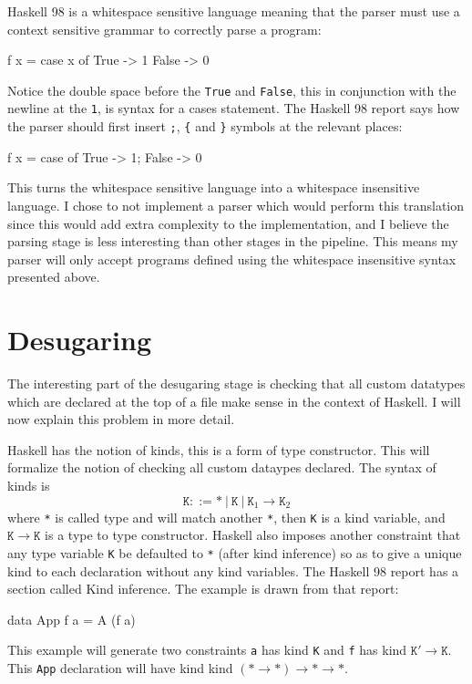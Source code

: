 \documentclass[float=false, crop=false]{standalone}
\begin{document}
Haskell 98 is a whitespace sensitive language meaning that the parser must use a
context sensitive grammar to correctly parse a program:
\begin{HaskellLst}
f x = case x of 
  True  -> 1
  False -> 0
\end{HaskellLst}
Notice the double space before the \texttt{True} and \texttt{False}, this in conjunction with the
newline at the \texttt{1}, is syntax for a cases statement. The Haskell 98 report
says how the parser should first insert \texttt{;},  \texttt{\{} and \texttt{\}} symbols at the 
relevant places:
\begin{HaskellLst}
f x = case of {
  True  -> 1;
  False -> 0
}
\end{HaskellLst}
This turns the whitespace sensitive language into a whitespace insensitive language. I chose to 
not implement a parser which would perform this translation since this would add extra complexity to the
implementation, and I believe the parsing stage is less interesting than other stages in the pipeline.
This means my parser will only accept programs defined using the whitespace insensitive 
syntax presented above.


\section{Desugaring}

The interesting part of the desugaring stage is 
checking that all custom datatypes which are declared at the top of a
file make sense in the context of Haskell. I will now explain this
problem in more detail.

Haskell has the notion of kinds, this is a form of type constructor. This will
formalize the notion of checking all custom dataypes declared.
The syntax of kinds is
\[ \mathtt{K} ::= \mathtt{*}\ |\ \mathtt{K}\  |\ \mathtt{K}_1 \rightarrow \mathtt{K}_2 \] 
where \texttt{*} is called type and will match another
\texttt{*}, then \texttt{K} is a kind variable, and $\mathtt{K} \rightarrow \mathtt{K}$ is a type to type constructor.
Haskell also imposes another constraint that any type variable \texttt{K} 
be defaulted to \texttt{*} (after kind inference) so as to give a
unique kind to each declaration without any kind variables.
The Haskell 98 report has a section \cite[4.6]{haskell98-spec} called Kind inference.
The example is drawn from that report:
\begin{HaskellLst}
data App f a = A (f a)
\end{HaskellLst}
This example will generate two constraints \texttt{a} has kind \texttt{K} and \texttt{f} 
has kind $\mathtt{K'} \rightarrow \mathtt{K}$. This \texttt{App} declaration will have kind  
kind $(\mathtt{*}\rightarrow\mathtt{*})\rightarrow\mathtt{*}\rightarrow
\mathtt{*}$.
\end{document}

